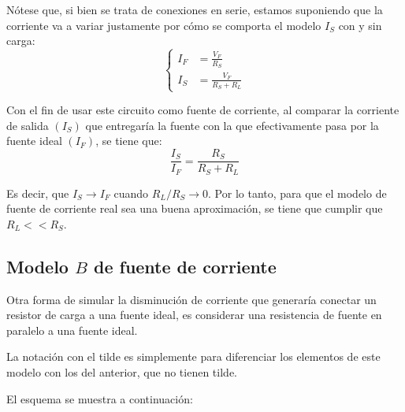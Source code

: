 Nótese que, si bien se trata de conexiones en serie, estamos suponiendo que la corriente va a variar justamente por cómo se comporta el modelo $I_S$ con y sin carga:
\begin{equation*}
    \left\{
    \begin{aligned}
        I_F &= \frac{V_F}{R_S}
        \\[1ex]
        I_S &= \frac{V_F}{R_S + R_L}
    \end{aligned}
    \right.
\end{equation*}

Con el fin de usar este circuito como fuente de corriente, al comparar la corriente de salida $(I_S)$ que entregaría la fuente con la que efectivamente pasa por la fuente ideal $(I_F)$, se tiene que:
\begin{equation*}
    \frac{I_S}{I_F} = \frac{R_S}{R_S + R_L}
\end{equation*}

Es decir, que $I_S \to I_F$ cuando $R_L/R_S \to 0$.
Por lo tanto, para que el modelo de fuente de corriente real sea una buena aproximación, se tiene que cumplir que $R_L<<R_S$.

\begin{center}
    \def\svgwidth{0.6\linewidth}
    
\end{center}


\subsection{Modelo $B$ de fuente de corriente}

Otra forma de simular la disminución de corriente que generaría conectar un resistor de carga a una fuente ideal, es considerar una resistencia de fuente en paralelo a una fuente ideal.

La notación con el tilde es simplemente para diferenciar los elementos de este modelo con los del anterior, que no tienen tilde.

El esquema se muestra a continuación:

\begin{multicols}{2}
    \begin{center}
        \def\svgwidth{0.9\linewidth}
        
    \end{center}
    \begin{center}
        \def\svgwidth{0.9\linewidth}
        
    \end{center}
\end{multicols}

